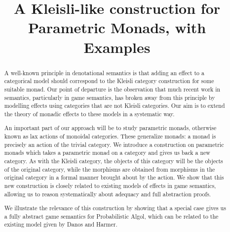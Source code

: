 \documentclass{svproc}
\begin{document}
\mainmatter              %
%
\title{A Kleisli-like construction for Parametric Monads, with Examples}
%
%
\author{}
%
\authorrunning{} %
%
\tocauthor{}
%

\maketitle              %

\begin{abstract}
  A well-known principle in denotational semantics is that adding an effect to a categorical model should correspond to the Kleisli category construction for some suitable monad.  
  Our point of departure is the observation that much recent work in semantics, particularly in game semantics, has broken away from this principle by modelling effects using categories that are not Kleisli categories.  
  Our aim is to extend the theory of monadic effects to these models in a systematic way.

  An important part of our approach will be to study parametric monads, otherwise known as lax actions of monoidal categories.
  These generalize monads: a monad is precisely an action of the trivial category.
  We introduce a construction on parametric monads which takes a parametric monad on a category and gives us back a new category.  
  As with the Kleisli category, the objects of this category will be the objects of the original category, while the morphisms are obtained from morphisms in the original category in a formal manner brought about by the action.  
  We show that this new construction is closely related to existing models of effects in game semantics, allowing us to reason systematically about adequacy and full abstraction proofs.

  We illustrate the relevance of this construction by showing that a special case gives us a fully abstract game semantics for Probabilistic Algol, which can be related to the existing model given by Danos and Harmer.
\end{abstract}
\end{document}
